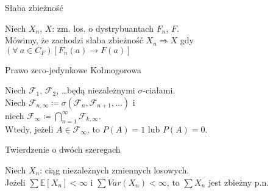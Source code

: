 \documentclass[avery5371,grid,frame]{flashcards}
\begin{document}
\begin{flashcard}[Definicja]{Słaba zbieżność}

\smallskip
Niech $X_n$, $X$: zm. los. o dystrybuantach $F_n$, $F$. \\
Mówimy, że zachodzi słaba zbieżność $X_n \Rightarrow X$ gdy $\left( \forall \ a \in C_F \right) \left[ F_n(a) \rightarrow F(a) \right]$
\end{flashcard}

\begin{flashcard}[Twierdzenie]{Prawo zero-jedynkowe Kołmogorowa}

\smallskip
Niech $\mathcal{F}_1$, $\mathcal{F}_2$, \dots będą niezależnymi $\sigma$-ciałami. \\
Niech $\mathcal{F}_{n, \infty} \coloneqq \sigma(\mathcal{F}_n, \mathcal{F}_{n+1}, \dots)$ i \\ niech $\mathcal{F}_\infty \coloneqq \bigcap \limits_{n=1}^\infty \mathcal{F}_{k, \infty}$. \\
Wtedy, jeżeli $A \in \mathcal{F}_\infty$, to $P(A) = 1$ lub $P(A) = 0$.
\end{flashcard}

\begin{flashcard}[Twierdzenie]{Twierdzenie o dwóch szeregach}

\smallskip
Niech $X_n$: ciąg niezależnych zmiennych losowych. \\
Jeżeli $\sum \mathbb{E}[X_n] < \infty$ i $\sum Var(X_n) < \infty$, to $\sum X_n$ jest zbieżny p.n.
\end{flashcard}
\end{document}
